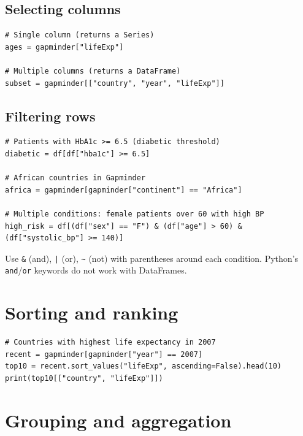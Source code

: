 \subsection{Selecting columns}

\begin{verbatim}
# Single column (returns a Series)
ages = gapminder["lifeExp"]

# Multiple columns (returns a DataFrame)
subset = gapminder[["country", "year", "lifeExp"]]
\end{verbatim}

\subsection{Filtering rows}

\begin{verbatim}
# Patients with HbA1c >= 6.5 (diabetic threshold)
diabetic = df[df["hba1c"] >= 6.5]

# African countries in Gapminder
africa = gapminder[gapminder["continent"] == "Africa"]

# Multiple conditions: female patients over 60 with high BP
high_risk = df[(df["sex"] == "F") & (df["age"] > 60) & (df["systolic_bp"] >= 140)]
\end{verbatim}

\begin{warningbox}
Use \texttt{\&} (and), \texttt{|} (or), \texttt{\textasciitilde} (not) with parentheses around each condition. Python's \texttt{and}/\texttt{or} keywords do not work with DataFrames.
\end{warningbox}

\section{Sorting and ranking}

\begin{verbatim}
# Countries with highest life expectancy in 2007
recent = gapminder[gapminder["year"] == 2007]
top10 = recent.sort_values("lifeExp", ascending=False).head(10)
print(top10[["country", "lifeExp"]])
\end{verbatim}

\section{Grouping and aggregation}

